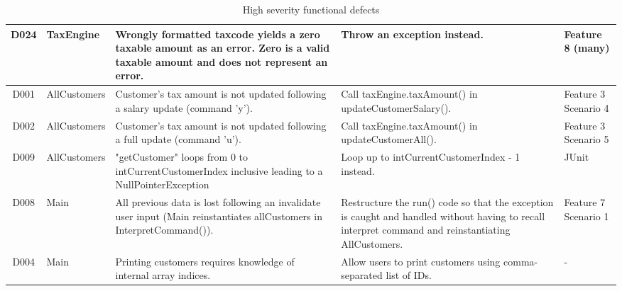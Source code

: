 \begin{table}[H]
\begin{tabularx}{\textwidth}{| c | P | X | X | P |}
D024 
& TaxEngine 
& Wrongly formatted taxcode yields a zero taxable amount as an error. Zero is a valid taxable amount and does not represent an error. 
& Throw an exception instead.
& Feature 8 (many)\\
\hline %
D001 
& AllCustomers 
& Customer's tax amount is not updated following a salary update (command 'y'). 
& Call taxEngine.taxAmount() in updateCustomerSalary(). 
& Feature 3 Scenario 4 \\
\hline %
D002 
& AllCustomers 
& Customer's tax amount is not updated following a full update (command 'u').
& Call taxEngine.taxAmount() in updateCustomerAll(). 
& Feature 3 Scenario 5\\
\hline %
D009 
& AllCustomers 
& "getCustomer" loops from 0 to intCurrentCustomerIndex inclusive leading to a NullPointerException
& Loop up to intCurrentCustomerIndex - 1 instead.
& JUnit  \\
\hline %
D008 
& Main
& All previous data is lost following an invalidate user input (Main reinstantiates allCustomers in InterpretCommand()).
& Restructure the run() code so that the exception is caught and handled without having to recall interpret command and reinstantiating AllCustomers. 
& Feature 7 Scenario 1 \\
\hline %
D004 
& Main 
& Printing customers requires knowledge of internal array indices.  
& Allow users to print customers using comma-separated list of IDs.
& -\\
\hline %
\end{tabularx}
\caption{High severity functional defects}
\end{table}



